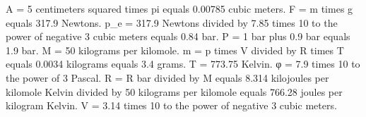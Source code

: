 A = 5 centimeters squared times pi equals 0.00785 cubic meters.  
F = m times g equals 317.9 Newtons.  
p_e = 317.9 Newtons divided by 7.85 times 10 to the power of negative 3 cubic meters equals 0.84 bar.  
P = 1 bar plus 0.9 bar equals 1.9 bar.  
M = 50 kilograms per kilomole.  
m = p times V divided by R times T equals 0.0034 kilograms equals 3.4 grams.  
T = 773.75 Kelvin.  
φ = 7.9 times 10 to the power of 3 Pascal.  
R = R bar divided by M equals 8.314 kilojoules per kilomole Kelvin divided by 50 kilograms per kilomole equals 766.28 joules per kilogram Kelvin.  
V = 3.14 times 10 to the power of negative 3 cubic meters.
